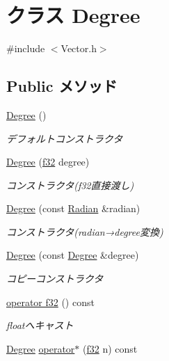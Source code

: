 \hypertarget{class_degree}{\section{クラス Degree}
\label{class_degree}
}


{\ttfamily \#include $<$Vector.\-h$>$}

\subsection*{Public メソッド}
\begin{DoxyCompactItemize}
\item 
\hyperlink{class_degree_a682448dac9d2292ea0ff765373eac216}{Degree} ()
\begin{DoxyCompactList}\small\item\em デフォルトコンストラクタ \end{DoxyCompactList}\item 
\hyperlink{class_degree_a1974c1a232aa2348c38dc51112dd1f7b}{Degree} (\hyperlink{_main_8h_a5f6906312a689f27d70e9d086649d3fd}{f32} degree)
\begin{DoxyCompactList}\small\item\em コンストラクタ(f32直接渡し) \end{DoxyCompactList}\item 
\hyperlink{class_degree_aa1512d83e224ca09c7706304260dc1bc}{Degree} (const \hyperlink{class_radian}{Radian} \&radian)
\begin{DoxyCompactList}\small\item\em コンストラクタ(radian→degree変換) \end{DoxyCompactList}\item 
\hyperlink{class_degree_aeeb671d2c215e253aa25f16ce9cb1fb1}{Degree} (const \hyperlink{class_degree}{Degree} \&degree)
\begin{DoxyCompactList}\small\item\em コピーコンストラクタ \end{DoxyCompactList}\item 
\hyperlink{class_degree_ae08c8bfc79ef6ac56992008d669f3348}{operator f32} () const 
\begin{DoxyCompactList}\small\item\em floatへキャスト \end{DoxyCompactList}\item 
\hyperlink{class_degree}{Degree} \hyperlink{class_degree_a979e9eabf4011cafdb254516bb2dbf01}{operator$\ast$} (\hyperlink{_main_8h_a5f6906312a689f27d70e9d086649d3fd}{f32} n) const 

\end{DoxyCompactItemize}
